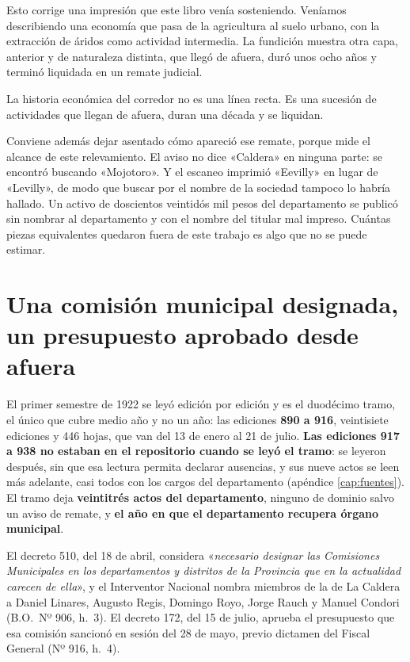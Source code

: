 Esto corrige una impresión que este libro venía sosteniendo. Veníamos describiendo una
economía que pasa de la agricultura al suelo urbano, con la extracción de áridos como
actividad intermedia. La fundición muestra otra capa, anterior y de naturaleza distinta,
que llegó de afuera, duró unos ocho años y terminó liquidada en un remate judicial.

La historia económica del corredor no es una línea recta. Es una sucesión de actividades
que llegan de afuera, duran una década y se liquidan.

Conviene además dejar asentado cómo apareció ese remate, porque mide el alcance de este
relevamiento. El aviso no dice «Caldera» en ninguna parte: se encontró buscando «Mojotoro».
Y el escaneo imprimió «Eevilly» en lugar de «Levilly», de modo que buscar por el nombre de
la sociedad tampoco lo habría hallado. Un activo de doscientos veintidós mil pesos del
departamento se publicó sin nombrar al departamento y con el nombre del titular mal
impreso. Cuántas piezas equivalentes quedaron fuera de este trabajo es algo que no se puede
estimar.

\section{Una comisión municipal designada, un presupuesto aprobado desde afuera}

El primer semestre de 1922 se leyó edición por edición y es el duodécimo tramo, el único que
cubre medio año y no un año: las ediciones \textbf{890 a 916}, veintisiete ediciones y 446 hojas,
que van del 13 de enero al 21 de julio. \textbf{Las ediciones 917 a 938 no estaban en el repositorio cuando se leyó el tramo}: se leyeron
después, sin que esa lectura permita declarar ausencias, y sus nueve actos se leen más adelante, casi
todos con los cargos del departamento (apéndice \ref{cap:fuentes}). El tramo deja \textbf{veintitrés actos del departamento},
ninguno de dominio salvo un aviso de remate, y \textbf{el año en que el departamento recupera
órgano municipal}.

El decreto 510, del 18 de abril, considera «\textit{necesario designar las Comisiones Municipales
en los departamentos y distritos de la Provincia que en la actualidad carecen de ella}», y
el Interventor Nacional nombra miembros de la de La Caldera a Daniel Linares, Augusto
Regis, Domingo Royo, Jorge Rauch y Manuel Condori (B.O.\ Nº 906, h.\ 3). El decreto 172, del 15 de julio, aprueba
el presupuesto que esa comisión sancionó en sesión del 28 de mayo, previo dictamen del
Fiscal General (Nº 916, h.\ 4).

